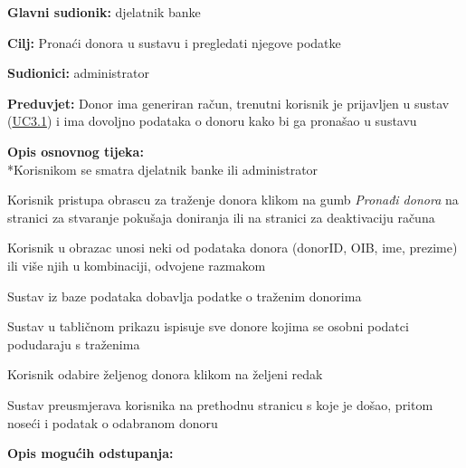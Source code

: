					
					\noindent {}
					\begin{packed_item}  \label{UC4.1}
	
						\item \textbf{Glavni sudionik: }djelatnik banke
						\item  \textbf{Cilj:} Pronaći donora u sustavu i pregledati njegove podatke
						\item  \textbf{Sudionici:} administrator
						\item  \textbf{Preduvjet:} Donor ima generiran račun, trenutni korisnik je prijavljen u sustav (\hyperref[UC3.1]{UC3.1}) i ima dovoljno podataka o donoru kako bi ga pronašao u sustavu
						\item  \textbf{Opis osnovnog tijeka:}
						\\ *Korisnikom se smatra djelatnik banke ili administrator
						\item[] \begin{packed_enum}
	                    
	                        \item Korisnik pristupa obrascu za traženje donora klikom na gumb \textit{Pronađi donora} na stranici za stvaranje pokušaja doniranja ili na stranici za deaktivaciju računa
	                        \item Korisnik u obrazac unosi neki od podataka donora (donorID, OIB, ime, prezime) ili više njih u kombinaciji, odvojene razmakom
	                        \item Sustav iz baze podataka dobavlja podatke o traženim donorima
	                        \item Sustav u tabličnom prikazu ispisuje sve donore kojima se osobni podatci podudaraju s traženima
	                        \item Korisnik odabire željenog donora klikom na željeni redak
	                        \item Sustav preusmjerava korisnika na prethodnu stranicu s koje je došao, pritom noseći i podatak o odabranom donoru

						\end{packed_enum}
						
						\item  \textbf{Opis mogućih odstupanja:}
						\item[] \begin{packed_item}
	

\end{packed_item}
\end{packed_item}
